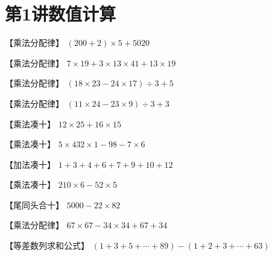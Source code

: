 \section{第1讲\quad 数值计算}

\item {
    【乘法分配律】
    $(200+2)\times 5 + 5020$
    \vspace{1cm}
}

\item {
    【乘法分配律】
    $7\times 19 + 3\times 13\times 41 + 13\times 19$
    \vspace{1cm}
}

\item {
    【乘法分配律】
    $(18\times 23 - 24\times 17)\div 3 + 5$
    \vspace{1cm}
}

\item {
    【乘法分配律】
    $(11\times 24 - 23\times 9)\div 3 + 3$
    \vspace{1cm}
}

\item {
    【乘法凑十】
    $12\times 25 + 16\times 15$
    \vspace{1cm}
}

\item {
    【乘法凑十】
    $5\times 432\times 1 - 98 - 7\times 6$
    \vspace{1cm}
}

\item {
    【加法凑十】
    $1+3+4+6+7+9+10 + 12$
    \vspace{1cm}
}

\item {
    【乘法凑十】
    $210\times 6 - 52\times 5$
    \vspace{1cm}
}

\item {
    【尾同头合十】
    $5000- 22\times 82$  
    \vspace{1cm}
}

\item {
    【乘法分配律】
    $67\times 67 - 34\times 34 + 67 + 34$
    \vspace{1cm}
}

\item {
    【等差数列求和公式】
    $(1+3+5+\cdots + 89) - (1+2+3+\cdots + 63)$  
    \vspace{1cm}
}

